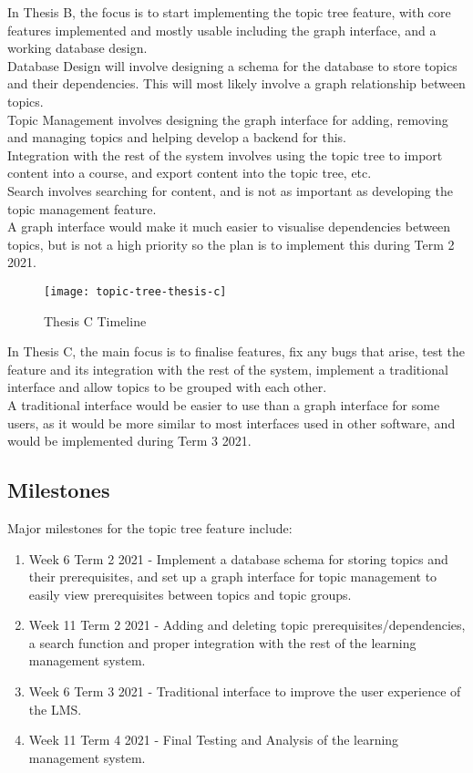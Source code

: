 In Thesis B, the focus is to start implementing the topic tree feature, with core features implemented and mostly usable including the graph interface, and a working database design. \\

Database Design will involve designing a schema for the database to store topics and their dependencies. This will most likely involve a graph relationship between topics.\\
Topic Management involves designing the graph interface for adding, removing and managing topics and helping develop a backend for this.\\
Integration with the rest of the system involves using the topic tree to import content into a course, and export content into the topic tree, etc.\\
Search involves searching for content, and is not as important as developing the topic management feature.\\
A graph interface would make it much easier to visualise dependencies between topics, but is not a high priority so the plan is to implement this during Term 2 2021.\\

\begin{figure}[h!]
    \centering
    \texttt{[image: topic-tree-thesis-c]}
    \caption{Thesis C Timeline}
\end{figure}

In Thesis C, the main focus is to finalise features, fix any bugs that arise, test the feature and its integration with the rest of the system, implement a traditional interface and allow topics to be grouped with each other.\\

A traditional interface would be easier to use than a graph interface for some users, as it would be more similar to most interfaces used in other software, and would be implemented during Term 3 2021.\\

\newpage
\subsection{Milestones}
Major milestones for the topic tree feature include: \\
\begin{enumerate}
\item Week 6 Term 2 2021 - Implement a database schema for storing topics and their prerequisites, and set up a graph interface for topic management to easily view prerequisites between topics and topic groups.
\item Week 11 Term 2 2021 - Adding and deleting topic prerequisites/dependencies, a search function and proper integration with the rest of the learning management system.
\item Week 6 Term 3 2021 - Traditional interface to improve the user experience of the LMS.
\item Week 11 Term 4 2021 - Final Testing and Analysis of the learning management system.
\end{enumerate}

